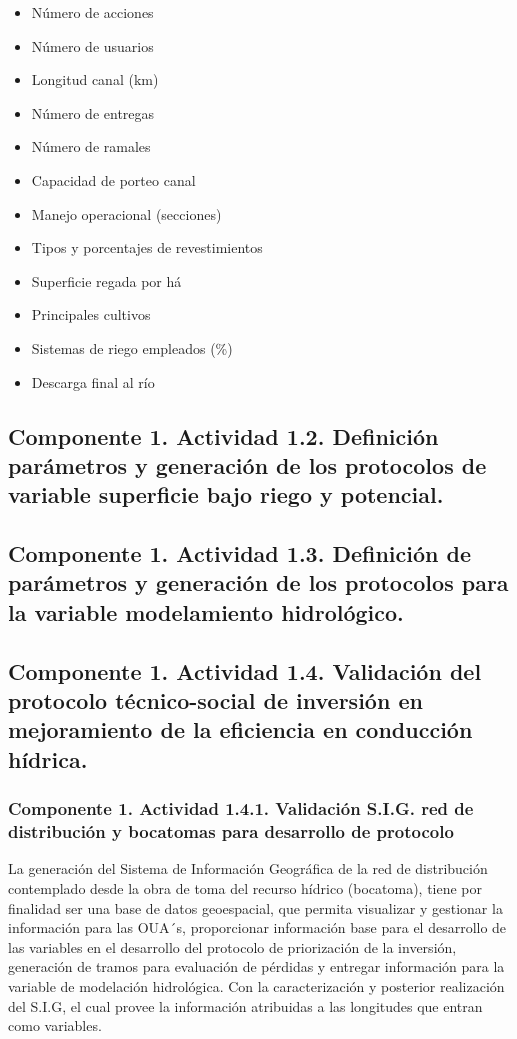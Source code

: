 \documentclass[]{article}
\begin{document}
\begin{itemize}
\item Número de acciones
\item Número de usuarios
\item Longitud canal (km)
\item Número de entregas
\item Número de ramales
\item Capacidad de porteo canal
\item Manejo operacional (secciones)
\item Tipos y porcentajes de revestimientos
\item Superficie regada por há
\item Principales cultivos
\item Sistemas de riego empleados (\%)
\item Descarga final al río
\end{itemize}

\subsection{Componente 1. Actividad 1.2. Definición parámetros y generación de los protocolos de variable superficie bajo riego y potencial.}

\subsection{Componente 1. Actividad 1.3. Definición de parámetros y generación de los protocolos para la variable modelamiento hidrológico.}


\subsection{Componente 1. Actividad 1.4. Validación del protocolo técnico-social de inversión en mejoramiento de la eficiencia en conducción hídrica.}

\subsubsection{Componente 1. Actividad 1.4.1. Validación S.I.G. red de distribución y bocatomas para desarrollo de protocolo}

La generación del Sistema de Información Geográfica de la red de distribución contemplado desde la obra de toma del recurso hídrico (bocatoma), tiene por finalidad ser una base de datos geoespacial, que permita visualizar y gestionar la información para las OUA´s, proporcionar información base para el desarrollo de las variables en el desarrollo del protocolo de priorización de la inversión, generación de tramos para evaluación de pérdidas y  entregar información para la variable de modelación hidrológica. Con la caracterización y posterior realización del S.I.G, el cual provee la información atribuidas a las longitudes que entran como variables.
 
\end{document}

